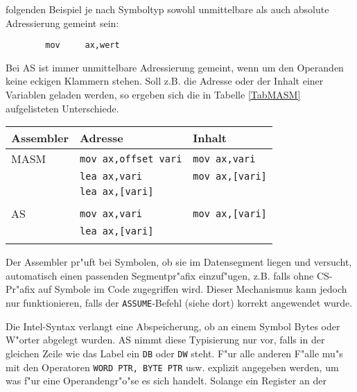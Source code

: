 \documentclass[12pt,a4paper,twoside]{report}
\newcommand{\tty}[1]{{\tt #1}}
\begin{document}
folgenden Beispiel je nach Symboltyp sowohl unmittelbare als auch absolute
Adressierung gemeint sein:
\begin{verbatim}
        mov     ax,wert
\end{verbatim}
Bei AS ist immer unmittelbare Adressierung gemeint, wenn um den Operanden
keine eckigen Klammern stehen.  Soll z.B. die Adresse oder der Inhalt einer
Variablen geladen werden, so ergeben sich die in Tabelle \ref{TabMASM}
aufgelisteten Unterschiede.
\begin{table*}
\begin{center}\begin{tabular}{|l|l|l|}
\hline
Assembler  & Adresse                  & Inhalt                 \\
\hline
\hline
MASM       & \tty{mov ax,offset vari} & \tty{mov ax,vari}      \\
           & \tty{lea ax,vari}        & \tty{mov ax,[vari]}    \\
           & \tty{lea ax,[vari]}      &                        \\
           &                          &                        \\
AS         & \tty{mov ax,vari}        & \tty{mov ax,[vari]}    \\
           & \tty{lea ax,[vari]}      &                        \\
           &                          &                        \\
\hline
\end{tabular}\end{center}
\caption{Unterschiede in der Adressierungssyntax AS$\leftrightarrow$MASM\label{TabMASM}}
\normalsize
\end{table*}
\par
Der Assembler pr"uft bei Symbolen, ob sie im Datensegment liegen und
versucht, automatisch einen passenden Segmentpr"afix einzuf"ugen, z.B.
falls ohne CS-Pr"afix auf Symbole im Code zugegriffen wird.  Dieser
Mechanismus kann jedoch nur funktionieren, falls der \tty{ASSUME}-Befehl
(siehe dort) korrekt angewendet wurde.
\par
Die Intel-Syntax verlangt eine Abspeicherung, ob an einem Symbol Bytes oder
W"orter abgelegt wurden.  AS nimmt diese Typisierung nur vor, falls in der
gleichen Zeile wie das Label ein \tty{DB} oder \tty{DW} steht.  F"ur alle anderen F"alle
mu"s mit den Operatoren \tty{WORD PTR, BYTE PTR} usw. explizit angegeben werden,
um was f"ur eine Operandengr"o"se es sich handelt.  Solange ein Register an der
\end{document}
